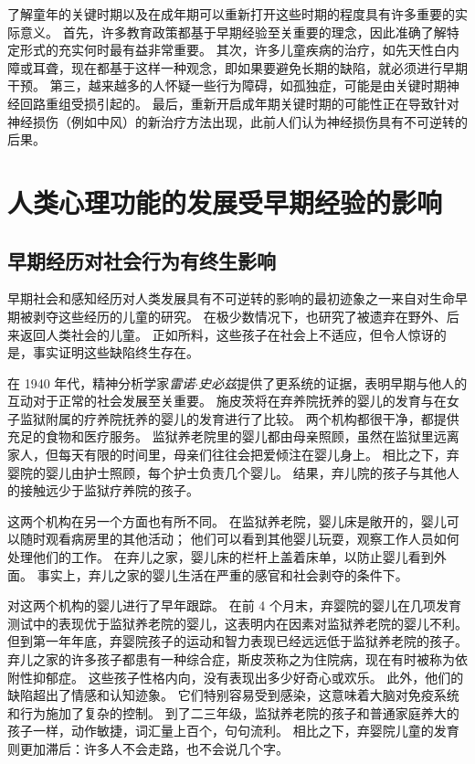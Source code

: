 了解童年的关键时期以及在成年期可以重新打开这些时期的程度具有许多重要的实际意义。
首先，许多教育政策都基于早期经验至关重要的理念，因此准确了解特定形式的充实何时最有益非常重要。
其次，许多儿童疾病的治疗，如先天性白内障或耳聋，现在都基于这样一种观念，即如果要避免长期的缺陷，就必须进行早期干预。
第三，越来越多的人怀疑一些行为障碍，如孤独症，可能是由关键时期神经回路重组受损引起的。
最后，重新开启成年期关键时期的可能性正在导致针对神经损伤（例如中风）的新治疗方法出现，此前人们认为神经损伤具有不可逆转的后果。



\section{人类心理功能的发展受早期经验的影响}

\subsection{早期经历对社会行为有终生影响}

早期社会和感知经历对人类发展具有不可逆转的影响的最初迹象之一来自对生命早期被剥夺这些经历的儿童的研究。
在极少数情况下，也研究了被遗弃在野外、后来返回人类社会的儿童。
正如所料，这些孩子在社会上不适应，但令人惊讶的是，事实证明这些缺陷终生存在。


在 1940 年代，精神分析学家\textit{雷诺$\cdot$史必兹}提供了更系统的证据，表明早期与他人的互动对于正常的社会发展至关重要。
施皮茨将在弃养院抚养的婴儿的发育与在女子监狱附属的疗养院抚养的婴儿的发育进行了比较。
两个机构都很干净，都提供充足的食物和医疗服务。
监狱养老院里的婴儿都由母亲照顾，虽然在监狱里远离家人，但每天有限的时间里，母亲们往往会把爱倾注在婴儿身上。
相比之下，弃婴院的婴儿由护士照顾，每个护士负责几个婴儿。
结果，弃儿院的孩子与其他人的接触远少于监狱疗养院的孩子。


这两个机构在另一个方面也有所不同。
在监狱养老院，婴儿床是敞开的，婴儿可以随时观看病房里的其他活动；
他们可以看到其他婴儿玩耍，观察工作人员如何处理他们的工作。
在弃儿之家，婴儿床的栏杆上盖着床单，以防止婴儿看到外面。
事实上，弃儿之家的婴儿生活在严重的感官和社会剥夺的条件下。


对这两个机构的婴儿进行了早年跟踪。
在前 4 个月末，弃婴院的婴儿在几项发育测试中的表现优于监狱养老院的婴儿，这表明内在因素对监狱养老院的婴儿不利。
但到第一年年底，弃婴院孩子的运动和智力表现已经远远低于监狱养老院的孩子。
弃儿之家的许多孩子都患有一种综合症，斯皮茨称之为住院病，现在有时被称为依附性抑郁症。
这些孩子性格内向，没有表现出多少好奇心或欢乐。 此外，他们的缺陷超出了情感和认知迹象。
它们特别容易受到感染，这意味着大脑对免疫系统和行为施加了复杂的控制。
到了二三年级，监狱养老院的孩子和普通家庭养大的孩子一样，动作敏捷，词汇量上百个，句句流利。
相比之下，弃婴院儿童的发育则更加滞后：许多人不会走路，也不会说几个字。


